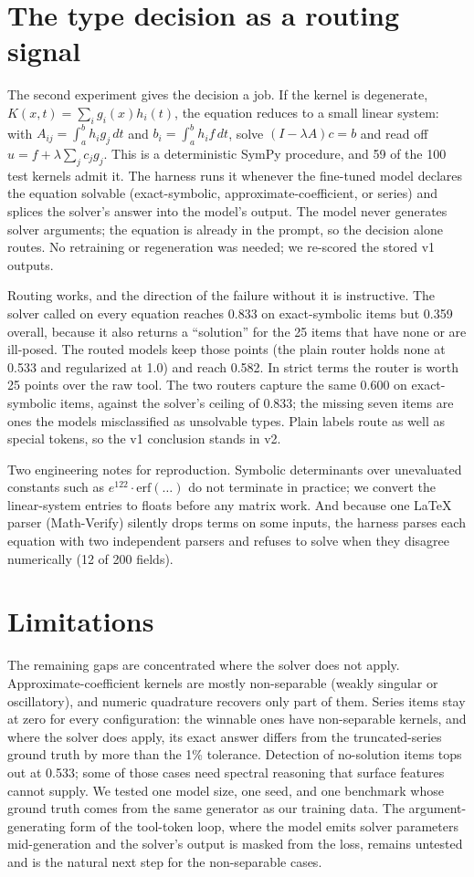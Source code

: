 \documentclass[11pt]{article}
\begin{document}
\section{The type decision as a routing signal}
The second experiment gives the decision a job. If the kernel is degenerate,
$K(x,t)=\sum_i g_i(x)h_i(t)$, the equation reduces to a small linear system:
with $A_{ij}=\int_a^b h_i g_j\,dt$ and $b_i=\int_a^b h_i f\,dt$, solve
$(I-\lambda A)c=b$ and read off $u = f + \lambda\sum_j c_j g_j$. This is a
deterministic SymPy procedure, and 59 of the 100 test kernels admit it. The
harness runs it whenever the fine-tuned model declares the equation solvable
(exact-symbolic, approximate-coefficient, or series) and splices the solver's
answer into the model's output. The model never generates solver arguments;
the equation is already in the prompt, so the decision alone routes. No
retraining or regeneration was needed; we re-scored the stored v1 outputs.

Routing works, and the direction of the failure without it is instructive.
The solver called on every equation reaches 0.833 on exact-symbolic items but
0.359 overall, because it also returns a ``solution'' for the 25 items that
have none or are ill-posed. The routed models keep those points (the plain
router holds none at 0.533 and regularized at 1.0) and reach 0.582. In strict
terms the router is worth 25 points over the raw tool. The two routers
capture the same 0.600 on exact-symbolic items, against the solver's ceiling
of 0.833; the missing seven items are ones the models misclassified as
unsolvable types. Plain labels route as well as special tokens, so the v1
conclusion stands in v2.

Two engineering notes for reproduction. Symbolic determinants over
unevaluated constants such as $e^{122}\!\cdot\mathrm{erf}(\dots)$ do not
terminate in practice; we convert the linear-system entries to floats before
any matrix work. And because one LaTeX parser (Math-Verify) silently drops
terms on some inputs, the harness parses each equation with two independent
parsers and refuses to solve when they disagree numerically (12 of 200
fields).

\section{Limitations}
The remaining gaps are concentrated where the solver does not apply.
Approximate-coefficient kernels are mostly non-separable (weakly singular or
oscillatory), and numeric quadrature recovers only part of them. Series items
stay at zero for every configuration: the winnable ones have non-separable
kernels, and where the solver does apply, its exact answer differs from the
truncated-series ground truth by more than the 1\% tolerance. Detection of
no-solution items tops out at 0.533; some of those cases need spectral
reasoning that surface features cannot supply. We tested one model size, one
seed, and one benchmark whose ground truth comes from the same generator as
our training data. The argument-generating form of the tool-token loop, where
the model emits solver parameters mid-generation and the solver's output is
masked from the loss, remains untested and is the natural next step for the
non-separable cases.
\end{document}
